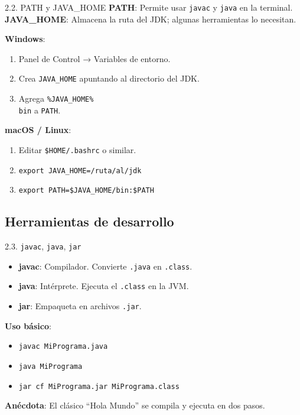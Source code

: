 \documentclass{beamer}
\begin{document}
\begin{frame}{2.2. PATH y JAVA\_HOME}
\textbf{PATH}: Permite usar \texttt{javac} y \texttt{java} en la terminal.\\
\textbf{JAVA\_HOME}: Almacena la ruta del JDK; algunas herramientas lo necesitan.

\textbf{Windows}:
\begin{enumerate}
  \item Panel de Control → Variables de entorno.
  \item Crea \texttt{JAVA\_HOME} apuntando al directorio del JDK.
  \item Agrega \texttt{\%JAVA\_HOME\%\\bin} a \texttt{PATH}.
\end{enumerate}

\textbf{macOS / Linux}:
\begin{enumerate}
  \item Editar \texttt{\$HOME/.bashrc} o similar.
  \item \texttt{export JAVA\_HOME=/ruta/al/jdk}
  \item \texttt{export PATH=\$JAVA\_HOME/bin:\$PATH}
\end{enumerate}
\end{frame}

\subsection{Herramientas de desarrollo}

\begin{frame}{2.3. \texttt{javac}, \texttt{java}, \texttt{jar}}
\begin{itemize}
  \item \textbf{javac}: Compilador. Convierte \texttt{.java} en \texttt{.class}.
  \item \textbf{java}: Intérprete. Ejecuta el \texttt{.class} en la JVM.
  \item \textbf{jar}: Empaqueta en archivos \texttt{.jar}.
\end{itemize}

\textbf{Uso básico}:
\begin{itemize}
  \item \texttt{javac MiPrograma.java}
  \item \texttt{java MiPrograma}
  \item \texttt{jar cf MiPrograma.jar MiPrograma.class}
\end{itemize}

\textbf{Anécdota}:  
El clásico “Hola Mundo” se compila y ejecuta en dos pasos.  
\end{frame}
\end{document}
